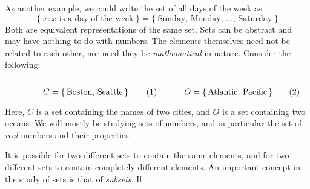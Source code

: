\documentclass[crop=false,class=book,oneside]{standalone}
\begin{document}
            \begin{lexample}
                As another example, we could write
                the set of all days of the week as:
                \begin{equation}
                    \{\;x:x\textrm{ is a day of the week}\;\}
                    =\{\;\textrm{Sunday, Monday, ..., Saturday}\;\}
                \end{equation}
                Both are equivalent representations of the
                same set.
                Sets can be abstract and may have nothing to do
                with numbers. The elements themselves need not be
                related to each other, nor need they be
                \textit{mathematical} in nature. Consider the
                following:
                \begin{subequations}
                    \begin{minipage}{0.49\textwidth}
                        \centering
                        \begin{equation}
                            C=\{\,\textrm{Boston, Seattle}\,\}
                        \end{equation}
                    \end{minipage}
                    \hfill
                    \begin{minipage}{0.49\textwidth}
                        \centering
                        \begin{equation}
                            O=\{\,\textrm{Atlantic, Pacific}\,\}
                        \end{equation}
                    \end{minipage}
                \end{subequations}
                \par\vspace{2.5ex}
                Here, $C$ is a set containing the names of two
                cities, and $O$ is a set containing two oceans.
                We will mostly be studying sets of numbers, and
                in particular the set of \textit{real} numbers
                and their properties.
            \end{lexample}
            It is possible for two different
            sets to contain the
            same elements, and for two different
            sets to contain
            completely different elements.
            An important concept in the study of
            sets is that of \textit{subsets}. If
\end{document}
